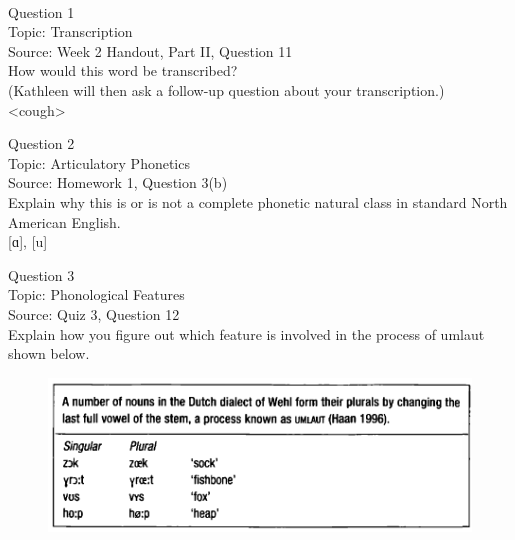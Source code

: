 \documentclass[12pt]{article}
\begin{document}
\begin{center}
\textbf{{\color{red}{\HUGE END OF EXAM}}}\\

\end{center}
\newpage

\begin{center}
\textbf{{\color{blue}{\HUGE START OF EXAM\\}}}

\textbf{{\color{blue}{\HUGE Student ID: 44237\\}}}

\textbf{{\color{blue}{\HUGE \\}}}

\end{center}
\newpage

{\large Question 1}\\

Topic: Transcription\\
Source: Week 2 Handout, Part II, Question 11\\

How would this word be transcribed?\\ (Kathleen will then ask a follow-up question about your transcription.)\\

<cough>


\newpage

{\large Question 2}\\

Topic: Articulatory Phonetics\\
Source: Homework 1, Question 3(b)\\

Explain why this is or is not a complete phonetic natural class in standard North American English.\\

{[ɑ]}, {[u]}


\newpage

{\large Question 3}\\

Topic: Phonological Features\\
Source: Quiz 3, Question 12\\

Explain how you figure out which feature is involved in the process of umlaut shown below.\\

\begin{figure}[H]
\includegraphics{../images/dutch.png}
\end{figure}
\end{document}
